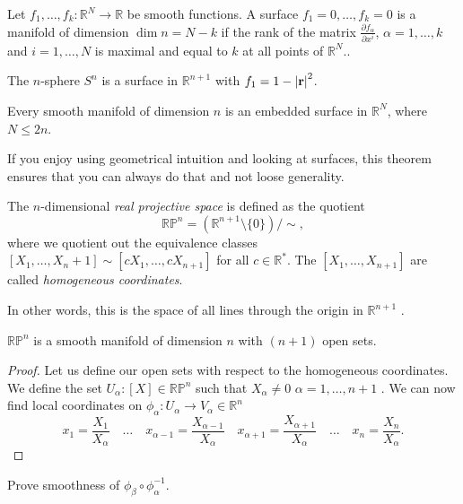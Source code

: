 
\begin{definition}[surface]
  Let $f_1, \dots, f_k \colon \mathbb{R}^N \to \mathbb{R}$  be smooth functions.
  A surface $f_1 = 0, \dots, f_k = 0$  is a manifold of dimension $\dim n = N - k$ if the rank of the matrix  $\frac{\partial f_{\alpha}}{\partial x^{i}}$, $\alpha = 1, \dots, k$ and $i = 1, \dots, N$ is maximal and equal to $k$ at all points of $\mathbb{R}^N$..
\end{definition}
\begin{example}[]
  The $n$-sphere $S^n$ is a surface in $\mathbb{R}^{n+1}$ with $f_1 = 1 - \abs{\vb{r}}^2$.
\end{example}

\begin{theorem}[Whitney]
  Every smooth manifold of dimension $n$ is an embedded surface in $\mathbb{R}^N$, where $N \leq 2 n$.
\end{theorem}
\begin{leftbar}
  If you enjoy using geometrical intuition and looking at surfaces, this theorem ensures that you can always do that and not loose generality.
\end{leftbar}

\begin{definition}
  The $n$-dimensional \emph{real projective space} is defined as the quotient
  \begin{equation}
    \mathbb{RP}^n = (\mathbb{R}^{n+1} \setminus \{0\}) / \sim,
  \end{equation}
  where we quotient out the equivalence classes $[X_1, \dots, X_n+1] \sim [c X_1, \dots, cX_{n+1}]$ for all $c \in \mathbb{R}^*$.
  The $[X_1, \dots, X_{n+1}]$ are called \emph{homogeneous coordinates}.
\end{definition}
In other words, this is the space of all lines through the origin in $\mathbb{R}^{n+1}$ .

\begin{claim}
  $\mathbb{RP}^n$ is a smooth manifold of dimension $n$ with $(n+1)$ open sets.
\end{claim}
\begin{proof}
  Let us define our open sets with respect to the homogeneous coordinates.
  We define the set $U_{\alpha} \colon [X] \in \mathbb{RP}^n$  such that $X_{\alpha} \neq 0$  $\alpha = 1, \dots, n+1$ .
  We can now find local coordinates on $\phi_{\alpha} \colon U_{\alpha} \to V_{\alpha} \in \mathbb{R}^n$
  \begin{equation}
    x_1 = \frac{X_1}{X_{\alpha}} \quad \dots \quad x_{\alpha-1} = \frac{X_{\alpha-1}}{X_{\alpha}} \quad x_{\alpha+1} = \frac{X_{\alpha +1}}{X_{\alpha}} \quad \dots \quad x_n = \frac{X_n}{X_\alpha}.
  \end{equation}
\end{proof}
\begin{exercise}
  Prove smoothness of $\phi_{\beta} \circ \phi_{\alpha}^{-1}$.
\end{exercise}

